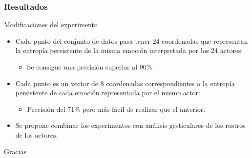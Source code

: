 \documentclass{beamer}
\begin{document}
\begin{frame}
\frametitle{Resultados}

\begin{block}{Modificaciones del experimento}
\begin{itemize}
\item<1-> Cada punto del conjunto de datos pasa tener 24 coordenadas que representan la entropía persistente de la misma emoción interpretada por los 24 actores:
\begin{itemize}
\item Se consigue una precisión superior al 90\%.
\end{itemize}
\item<2-> Cada punto es un vector de 8 coordenadas correspondientes a la entropía persistente de cada emoción representada por el mismo actor:
\begin{itemize}
\item Precisión del 71\% pero más fácil de realizar que el anterior.
\end{itemize}
\item<3-> Se propone combinar los experimentos con análisis gesticulares de los rostros de los actores.
\end{itemize}
\end{block}


\end{frame}





\begin{frame}
\begin{center}


\begin{Huge}
Gracias
\end{Huge}
\end{center}
\end{frame}
\end{document}
